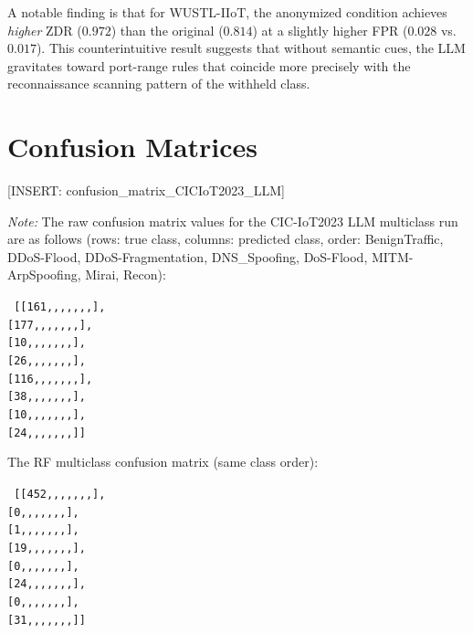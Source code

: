 A notable finding is that for WUSTL-IIoT, the anonymized condition achieves
\emph{higher} ZDR ($0.972$) than the original ($0.814$) at a slightly higher
FPR ($0.028$ vs.\ $0.017$). This counterintuitive result suggests that without
semantic cues, the LLM gravitates toward port-range rules that coincide more
precisely with the reconnaissance scanning pattern of the withheld class.

\section{Confusion Matrices}\label{app:confusion}

[INSERT: confusion\_matrix\_CICIoT2023\_LLM]

\noindent\textit{Note:} The raw confusion matrix values for the CIC-IoT2023
LLM multiclass run are as follows (rows: true class, columns: predicted class,
order: BenignTraffic, DDoS-Flood, DDoS-Fragmentation, DNS\_Spoofing,
DoS-Flood, MITM-ArpSpoofing, Mirai, Recon):

\vspace{0.5em}
\noindent\texttt{
[[161,,,,,,,],} \\
\texttt{\phantom{[}[177,,,,,,,],} \\
\texttt{\phantom{[}[10,,,,,,,],} \\
\texttt{\phantom{[}[26,,,,,,,],} \\
\texttt{\phantom{[}[116,,,,,,,],} \\
\texttt{\phantom{[}[38,,,,,,,],} \\
\texttt{\phantom{[}[10,,,,,,,],} \\
\texttt{\phantom{[}[24,,,,,,,]]}
\vspace{0.5em}

\noindent The RF multiclass confusion matrix (same class order):

\vspace{0.5em}
\noindent\texttt{
[[452,,,,,,,],} \\
\texttt{\phantom{[}[0,,,,,,,],} \\
\texttt{\phantom{[}[1,,,,,,,],} \\
\texttt{\phantom{[}[19,,,,,,,],} \\
\texttt{\phantom{[}[0,,,,,,,],} \\
\texttt{\phantom{[}[24,,,,,,,],} \\
\texttt{\phantom{[}[0,,,,,,,],} \\
\texttt{\phantom{[}[31,,,,,,,]]}
\vspace{0.5em}

